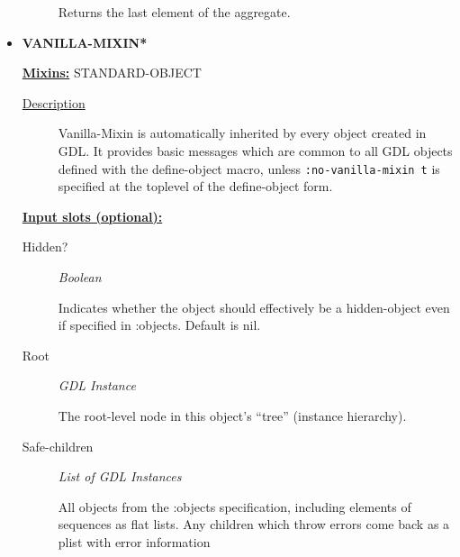 \documentclass [11pt]{book}
\begin{document}
\begin{itemize}
\begin{description}
 Returns the last element of the aggregate.




\end{description}







\item {}
\label{prim:vanilla-mixin*}
\textbf{VANILLA-MIXIN*}


\textbf{
\underline{Mixins:}} STANDARD-OBJECT





\begin{description}

\item [
\underline{Description}]


Vanilla-Mixin is automatically
inherited by every object created in GDL. It provides basic messages
which are common to all GDL objects defined with the define-object
macro, unless \texttt{:no-vanilla-mixin t} is specified at the
toplevel of the define-object form.



\end{description}








\textbf{
\underline{Input slots (optional):}}

\begin{description}

\item [Hidden?]
\emph{Boolean}

 Indicates whether the object should effectively be a hidden-object even if specified in :objects. Default is nil.




\item [Root]
\emph{GDL Instance}

 The root-level node in this object's ``tree'' (instance hierarchy).




\item [Safe-children]
\emph{List of GDL Instances}

 All objects from the :objects specification, including elements of sequences
as flat lists. Any children which throw errors come back as a plist with error information





\end{description}
\end{itemize}
\end{document}
